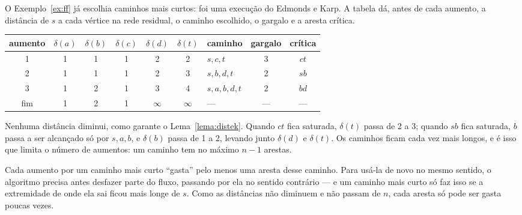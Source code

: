 \begin{exemplo}\label{ex:ekdist}
O Exemplo~\ref{ex:ff} já escolhia caminhos mais curtos: foi uma execução do Edmonds e Karp. A tabela dá, antes de cada aumento, a distância de $s$ a cada vértice na rede residual, o caminho escolhido, o gargalo e a aresta crítica.
\begin{center}\small
\begin{tabular}{@{}cccccclcc@{}}
\toprule
aumento & $\delta(a)$ & $\delta(b)$ & $\delta(c)$ & $\delta(d)$ & $\delta(t)$ & caminho & gargalo & crítica\\
\midrule
1 & 1 & 1 & 1 & 2 & 2 & $s,c,t$ & 3 & $ct$\\
2 & 1 & 1 & 1 & 2 & 3 & $s,b,d,t$ & 2 & $sb$\\
3 & 1 & 2 & 1 & 3 & 4 & $s,a,b,d,t$ & 2 & $bd$\\
fim & 1 & 2 & 1 & $\infty$ & $\infty$ & --- & --- & ---\\
\bottomrule
\end{tabular}
\end{center}
Nenhuma distância diminui, como garante o Lema~\ref{lema:distek}. Quando $ct$ fica saturada, $\delta(t)$ passa de 2 a 3; quando $sb$ fica saturada, $b$ passa a ser alcançado só por $s,a,b$, e $\delta(b)$ passa de 1 a 2, levando junto $\delta(d)$ e $\delta(t)$. Os caminhos ficam cada vez mais longos, e é isso que limita o número de aumentos: um caminho tem no máximo $n-1$ arestas.
\end{exemplo}

\begin{intuicao}
Cada aumento por um caminho mais curto ``gasta'' pelo menos uma aresta desse caminho. Para usá-la de novo no mesmo sentido, o algoritmo precisa antes desfazer parte do fluxo, passando por ela no sentido contrário --- e um caminho mais curto só faz isso se a extremidade de onde ela sai ficou mais longe de $s$. Como as distâncias não diminuem e não passam de $n$, cada aresta só pode ser gasta poucas vezes.
\end{intuicao}

